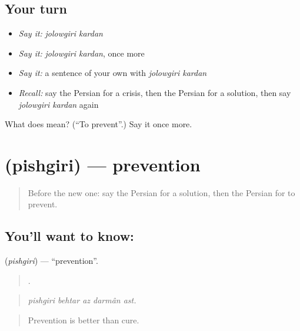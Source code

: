 \subsection*{Your turn}
\begin{itemize}
\raggedright
  \item \emph{Say it:} \emph{jolowgiri kardan}
  \item \emph{Say it:} \emph{jolowgiri kardan}, once more
  \item \emph{Say it:} a sentence of your own with \emph{jolowgiri kardan}
  \item \emph{Recall:} say the Persian for a crisis, then the Persian for a solution, then say \emph{jolowgiri kardan} again
\end{itemize}

\begin{tcolorbox}[breakable,colback=teal!4,colframe=teal!35!black,title={Before you move on}]
What does   mean? (\textquotedblleft{}To prevent\textquotedblright{}.) Say it once more.
\end{tcolorbox}
\section[\texorpdfstring{\fa{پیشگیری} (pishgiri)}{پیشگیری (pishgiri)}]{ (pishgiri) — prevention}

\label{lesson:FA-C377-pishgiri}



\begin{quote}
Before the new one: say the Persian for a solution, then the Persian for to prevent.
\end{quote}

\subsection*{You'll want to know: }
\textbf{} (\emph{pishgiri}) — \textquotedblleft{}prevention\textquotedblright{}.

\begin{quote}
    .
\end{quote}

\begin{quote}
\emph{pishgiri behtar az darmân ast.}
\end{quote}

\begin{quote}
Prevention is better than cure.
\end{quote}

